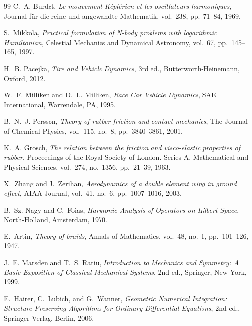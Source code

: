 \documentclass[11pt,a4paper,reqno]{article}
\theoremstyle{plain}
\theoremstyle{definition}
\theoremstyle{remark}
\numberwithin{equation}{section}
\begin{document}
\begin{thebibliography}{99}
C.~A. Burdet,
\emph{Le mouvement K\'{e}pl\'{e}rien et les oscillateurs harmoniques},
Journal f\"{u}r die reine und angewandte Mathematik, vol.~238, pp.~71--84, 1969.

S.~Mikkola,
\emph{Practical formulation of N-body problems with logarithmic Hamiltonian},
Celestial Mechanics and Dynamical Astronomy, vol.~67, pp.~145--165, 1997.

H.~B. Pacejka,
\emph{Tire and Vehicle Dynamics},
3rd ed., Butterworth-Heinemann, Oxford, 2012.

W.~F. Milliken and D.~L. Milliken,
\emph{Race Car Vehicle Dynamics},
SAE International, Warrendale, PA, 1995.

B.~N.~J. Persson,
\emph{Theory of rubber friction and contact mechanics},
The Journal of Chemical Physics, vol.~115, no.~8, pp.~3840--3861, 2001.

K.~A. Grosch,
\emph{The relation between the friction and visco-elastic properties of rubber},
Proceedings of the Royal Society of London. Series A. Mathematical and Physical Sciences, vol.~274, no.~1356, pp.~21--39, 1963.

X.~Zhang and J.~Zerihan,
\emph{Aerodynamics of a double element wing in ground effect},
AIAA Journal, vol.~41, no.~6, pp.~1007--1016, 2003.

B.~Sz.-Nagy and C.~Foias,
\emph{Harmonic Analysis of Operators on Hilbert Space},
North-Holland, Amsterdam, 1970.

E.~Artin,
\emph{Theory of braids},
Annals of Mathematics, vol.~48, no.~1, pp.~101--126, 1947.

J.~E. Marsden and T.~S. Ratiu,
\emph{Introduction to Mechanics and Symmetry: A Basic Exposition of Classical Mechanical Systems},
2nd ed., Springer, New York, 1999.

E.~Hairer, C.~Lubich, and G.~Wanner,
\emph{Geometric Numerical Integration: Structure-Preserving Algorithms for Ordinary Differential Equations},
2nd ed., Springer-Verlag, Berlin, 2006.

\end{thebibliography}
\end{document}
